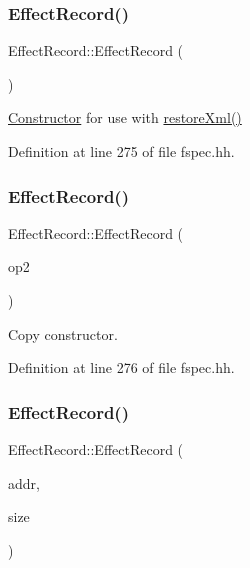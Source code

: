 \subsubsection{\texorpdfstring{EffectRecord()}{EffectRecord()}\hspace{0.1cm}{\footnotesize\ttfamily [1/5]}}
{\footnotesize\ttfamily Effect\+Record\+::\+Effect\+Record (\begin{DoxyParamCaption}\item[{void}]{ }\end{DoxyParamCaption})\hspace{0.3cm}{\ttfamily [inline]}}



\mbox{\hyperlink{class_constructor}{Constructor}} for use with \mbox{\hyperlink{class_effect_record_a4d01d27a405f3e595bc4e36bebfd33ca}{restore\+Xml()}} 



Definition at line 275 of file fspec.\+hh.

\mbox{\label{class_effect_record_ab05dcd1cc8377142d6a1427fedddcf21}} 
\subsubsection{\texorpdfstring{EffectRecord()}{EffectRecord()}\hspace{0.1cm}{\footnotesize\ttfamily [2/5]}}
{\footnotesize\ttfamily Effect\+Record\+::\+Effect\+Record (\begin{DoxyParamCaption}\item[{const \mbox{\hyperlink{class_effect_record}{Effect\+Record}} \&}]{op2 }\end{DoxyParamCaption})\hspace{0.3cm}{\ttfamily [inline]}}



Copy constructor. 



Definition at line 276 of file fspec.\+hh.

\mbox{\label{class_effect_record_af6e5a41aef5377b54447548ee514d0fc}} 
\subsubsection{\texorpdfstring{EffectRecord()}{EffectRecord()}\hspace{0.1cm}{\footnotesize\ttfamily [3/5]}}
{\footnotesize\ttfamily Effect\+Record\+::\+Effect\+Record (\begin{DoxyParamCaption}\item[{const \mbox{\hyperlink{class_address}{Address}} \&}]{addr,  }\item[{int4}]{size }\end{DoxyParamCaption})}



